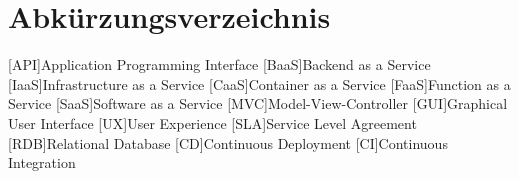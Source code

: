 \clearpage
\chapter*{Abkürzungsverzeichnis}	

\begin{acronym}[XXXXXXX] %
	[API]{Application Programming Interface}
	[BaaS]{Backend as a Service}
	[IaaS]{Infrastructure as a Service}
	[CaaS]{Container as a Service}
	[FaaS]{Function as a Service}
	[SaaS]{Software as a Service}
	[MVC]{Model-View-Controller}
	[GUI]{Graphical User Interface}
	[UX]{User Experience}
	[SLA]{Service Level Agreement}
	[RDB]{Relational Database}
	[CD]{Continuous Deployment}
	[CI]{Continuous Integration}
\end{acronym}